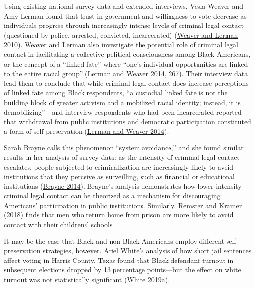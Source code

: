 \documentclass[
  12pt,
]{article}
\begin{document}
Using existing national survey data and extended interviews, Vesla Weaver and Amy Lerman found that trust in government and willingness to vote decrease as individuals progress through increasingly intense levels of criminal legal contact (questioned by police, arrested, convicted, incarcerated) (\protect\hyperlink{ref-Weaver2010}{Weaver and Lerman 2010}). Weaver and Lerman also investigate the potential role of criminal legal contact in facilitating a collective political consciousness among Black Americans, or the concept of a ``linked fate'' where ``one's individual opportunities are linked to the entire racial group'' (\protect\hyperlink{ref-Lerman2014}{Lerman and Weaver 2014, 267}). Their interview data lead them to conclude that while criminal legal contact does increase perceptions of linked fate among Black respondents, ``a custodial linked fate is not the building block of greater activism and a mobilized racial identity; instead, it is demobilizing''---and interview respondents who had been incarcerated reported that withdrawal from public institutions and democratic participation constituted a form of self-preservation (\protect\hyperlink{ref-Lerman2014}{Lerman and Weaver 2014}).

Sarah Brayne calls this phenomenon ``system avoidance,'' and she found similar results in her analysis of survey data: as the intensity of criminal legal contact escalates, people subjected to criminalization are increasingly likely to avoid institutions that they perceive as surveilling, such as financial or educational institutions (\protect\hyperlink{ref-Brayne2014}{Brayne 2014}). Brayne's analysis demonstrates how lower-intensity criminal legal contact can be theorized as a mechanism for discouraging Americans' participation in public institutions. Similarly, \protect\hyperlink{ref-Remster2018a}{Remster and Kramer} (\protect\hyperlink{ref-Remster2018a}{2018}) finds that men who return home from prison are more likely to avoid contact with their childrens' schools.

It may be the case that Black and non-Black Americans employ different self-preservation strategies, however. Ariel White's analysis of how short jail sentences affect voting in Harris County, Texas found that Black defendant turnout in subsequent elections dropped by 13 percentage points---but the effect on white turnout was not statistically significant (\protect\hyperlink{ref-White2019}{White 2019a}).
\end{document}
